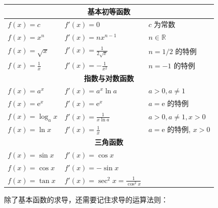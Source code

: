 \begin{center}
    \begin{tabular}{l l l}
        \toprule
        \multicolumn{3}{c}{\textbf{基本初等函数}}                                                         \\
        \midrule
        $f(x) = c$            & $f'(x) = 0$                             & $c$ 为常数                   \\
        $f(x) = x^n$          & $f'(x) = nx^{n-1}$                      & $n \in \mathbb{R}$        \\
        $f(x) = \sqrt{x}$     & $f'(x) = \frac{1}{2\sqrt{x}}$           & $n = 1/2$ 的特例             \\
        $f(x) = \frac{1}{x}$  & $f'(x) = -\frac{1}{x^2}$                & $n = -1$ 的特例              \\
        \midrule
        \multicolumn{3}{c}{\textbf{指数与对数函数}}                                                        \\
        \midrule
        $f(x) = a^x$          & $f'(x) = a^x \ln a$                     & $a>0, a \neq 1$           \\
        $f(x) = \mathrm{e}^x$ & $f'(x) = \mathrm{e}^x$                  & $a=\mathrm{e}$ 的特例        \\
        $f(x) = \log_a x$     & $f'(x) = \frac{1}{x \ln a}$             & $a>0, a \neq 1, x>0$      \\
        $f(x) = \ln x$        & $f'(x) = \frac{1}{x}$                   & $a=\mathrm{e}$ 的特例, $x>0$ \\
        \midrule
        \multicolumn{3}{c}{\textbf{三角函数}}                                                           \\
        \midrule
        $f(x) = \sin x$       & $f'(x) = \cos x$                        &                           \\
        $f(x) = \cos x$       & $f'(x) = -\sin x$                       &                           \\
        $f(x) = \tan x$       & $f'(x) = \sec^2 x = \frac{1}{\cos^2 x}$ &                           \\
        \bottomrule
    \end{tabular}
\end{center}

除了基本函数的求导，还需要记住求导的运算法则：


